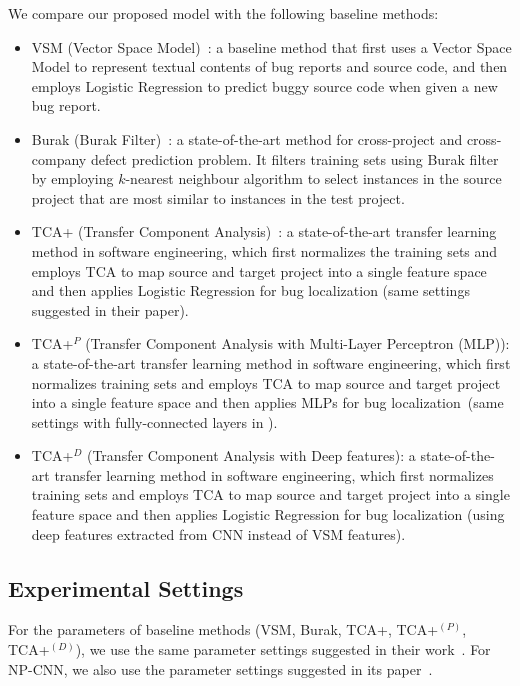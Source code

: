 We compare our proposed model \TRANPCNN with the following baseline methods:
\begin{itemize}
  \item VSM (Vector Space Model)~\cite{rao2011retrieval}: a baseline method that first uses a Vector Space Model to represent textual contents of bug reports and source code, and then employs Logistic Regression to predict buggy source code when given a new bug report.
  \item Burak (Burak Filter)~\cite{peters2013better}: a state-of-the-art method for cross-project and cross-company defect prediction problem. It filters training sets using Burak filter by employing $k$-nearest neighbour algorithm to select instances in the source project that are most similar to instances in the test project.
  \item TCA+ (Transfer Component Analysis)~\cite{NamPK13}: a state-of-the-art transfer learning method in software engineering, which first normalizes the training sets and employs TCA to map source and target project into a single feature space and then applies Logistic Regression for bug localization (same settings suggested in their paper). 
  \item TCA+$^P$ (Transfer Component Analysis with Multi-Layer Perceptron (MLP)): a state-of-the-art transfer learning method in software engineering, which first normalizes training sets and employs TCA to map source and target project into a single feature space and then applies MLPs for bug localization~(same settings with fully-connected layers in \TRANPCNN).
   \item TCA+$^D$ (Transfer Component Analysis with Deep features): a state-of-the-art transfer learning method in software engineering, which first normalizes training sets and employs TCA to map source and target project into a single feature space and then applies Logistic Regression for bug localization (using deep features extracted from CNN instead of VSM features).
\end{itemize}

\subsection{Experimental Settings}
For the parameters of baseline methods (VSM, Burak, TCA+, TCA+$^{(P)}$, TCA+$^{(D)}$), we use the same parameter settings suggested in their work~\cite{rao2011retrieval,NamPK13}. For NP-CNN, we also use the parameter settings suggested in its paper~\cite{huo2016learning}.

